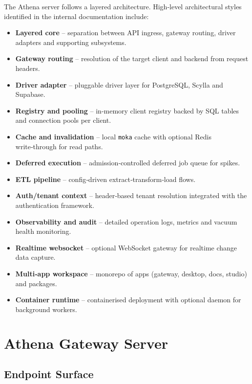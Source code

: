 \documentclass[11pt,a4paper]{article}
\begin{document}
The Athena server follows a layered architecture.  High‑level architectural styles identified in the internal documentation include:
\begin{itemize}
  \item \textbf{Layered core} – separation between API ingress, gateway routing, driver adapters and supporting subsystems.
  \item \textbf{Gateway routing} – resolution of the target client and backend from request headers.
  \item \textbf{Driver adapter} – pluggable driver layer for PostgreSQL, Scylla and Supabase.
  \item \textbf{Registry and pooling} – in‑memory client registry backed by SQL tables and connection pools per client.
  \item \textbf{Cache and invalidation} – local \texttt{moka} cache with optional Redis write‑through for read paths.
  \item \textbf{Deferred execution} – admission‑controlled deferred job queue for spikes.
  \item \textbf{ETL pipeline} – config‑driven extract‑transform‑load flows.
  \item \textbf{Auth/tenant context} – header‑based tenant resolution integrated with the authentication framework.
  \item \textbf{Observability and audit} – detailed operation logs, metrics and vacuum health monitoring.
  \item \textbf{Realtime websocket} – optional WebSocket gateway for realtime change data capture.
  \item \textbf{Multi‑app workspace} – monorepo of apps (gateway, desktop, docs, studio) and packages.
  \item \textbf{Container runtime} – containerised deployment with optional daemon for background workers.
\end{itemize}

\section{Athena Gateway Server}

\subsection{Endpoint Surface}
\end{document}
